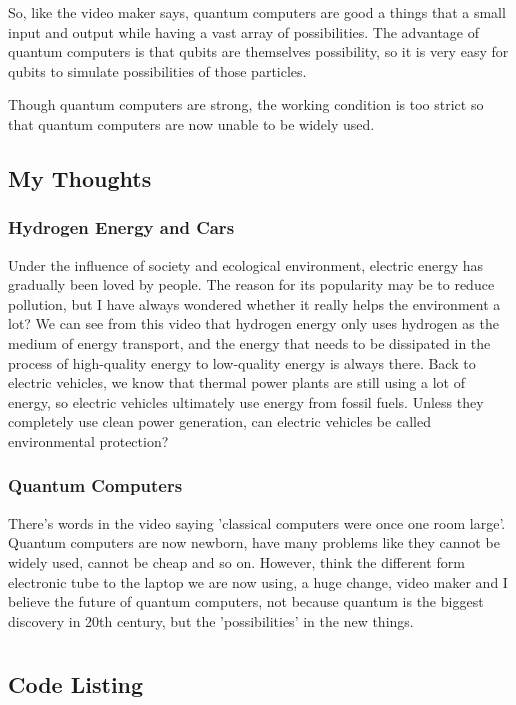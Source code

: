 \documentclass{article}
\begin{document}
So, like the video maker says, quantum computers are good a things that a small input and output while having a vast array of possibilities. The advantage of quantum computers is that qubits are themselves possibility, so it is very easy for qubits to simulate possibilities of those particles.

Though quantum computers are strong, the working condition is too strict so that quantum computers are now unable to be widely used.
\subsection{My Thoughts}
\subsubsection*{Hydrogen Energy and Cars}
Under the influence of society and ecological environment, electric energy has gradually been loved by people. The reason for its popularity may be to reduce pollution, but I have always wondered whether it really helps the environment a lot? We can see from this video that hydrogen energy only uses hydrogen as the medium of energy transport, and the energy that needs to be dissipated in the process of high-quality energy to low-quality energy is always there. Back to electric vehicles, we know that thermal power plants are still using a lot of energy, so electric vehicles ultimately use energy from fossil fuels. Unless they completely use clean power generation, can electric vehicles be called environmental protection?
\subsubsection*{Quantum Computers}
There's words in the video saying 'classical computers were once one room large'. Quantum computers are now newborn, have many problems like they cannot be widely used, cannot be cheap and so on. However, think the different form electronic tube to the laptop we are now using, a huge change, video maker and I believe the future of quantum computers, not because quantum is the biggest discovery in 20th century, but the 'possibilities' in the new things.
\section{}







\begin{appendices}
\section{Code Listing}
\end{appendices}
\end{document}
